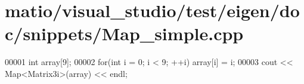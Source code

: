 \hypertarget{matio_2visual__studio_2test_2eigen_2doc_2snippets_2_map__simple_8cpp_source}{}\section{matio/visual\+\_\+studio/test/eigen/doc/snippets/\+Map\+\_\+simple.cpp}
\label{matio_2visual__studio_2test_2eigen_2doc_2snippets_2_map__simple_8cpp_source}

\begin{DoxyCode}
00001 \textcolor{keywordtype}{int} array[9];
00002 \textcolor{keywordflow}{for}(\textcolor{keywordtype}{int} i = 0; i < 9; ++i) array[i] = i;
00003 cout << Map<Matrix3i>(array) << endl;
\end{DoxyCode}
